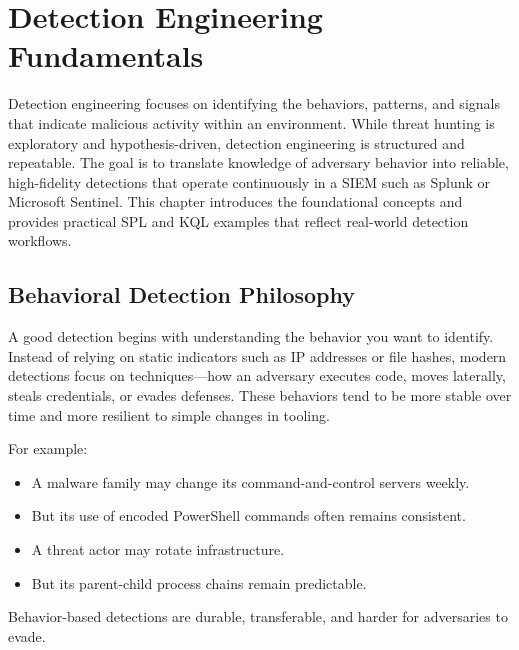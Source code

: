 \section{Detection Engineering Fundamentals}

Detection engineering focuses on identifying the behaviors, patterns, and signals that indicate malicious 
activity within an environment. While threat hunting is exploratory and hypothesis-driven, detection engineering 
is structured and repeatable. The goal is to translate knowledge of adversary behavior into reliable, high-fidelity 
detections that operate continuously in a SIEM such as Splunk or Microsoft Sentinel. This chapter introduces the 
foundational concepts and provides practical SPL and KQL examples that reflect real-world detection workflows.


\subsection*{Behavioral Detection Philosophy}

A good detection begins with understanding the behavior you want to identify. Instead of relying on static indicators 
such as IP addresses or file hashes, modern detections focus on techniques—how an adversary executes code, moves laterally, 
steals credentials, or evades defenses. These behaviors tend to be more stable over time and more resilient to simple 
changes in tooling.

For example:

\begin{itemize}
    \item A malware family may change its command-and-control servers weekly.
    \item But its use of encoded PowerShell commands often remains consistent.
    \item A threat actor may rotate infrastructure.
    \item But its parent-child process chains remain predictable.
\end{itemize}

Behavior-based detections are durable, transferable, and harder for adversaries to evade.



